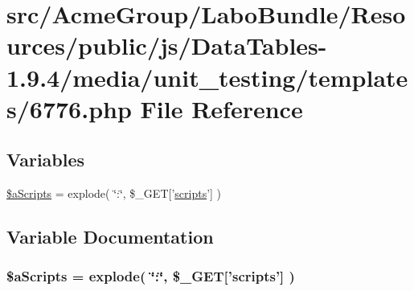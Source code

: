 \hypertarget{6776_8php}{\section{src/\+Acme\+Group/\+Labo\+Bundle/\+Resources/public/js/\+Data\+Tables-\/1.9.4/media/unit\+\_\+testing/templates/6776.php File Reference}
\label{6776_8php}
}
\subsection*{Variables}
\begin{DoxyCompactItemize}
\item 
\hyperlink{6776_8php_a3e8e1608000c9afdd05327fc2b06b056}{\$a\+Scripts} = explode( \char`\"{}\+:\char`\"{}, \$\+\_\+\+G\+E\+T\mbox{[}'\hyperlink{tinymce_8jquery_8dev_8js_a09066d4d580eeec222f858d588b4cdef}{scripts}'\mbox{]} )
\end{DoxyCompactItemize}


\subsection{Variable Documentation}
\hypertarget{6776_8php_a3e8e1608000c9afdd05327fc2b06b056}{
\subsubsection[{\$a\+Scripts}]{\setlength{\rightskip}{0pt plus 5cm}\$a\+Scripts = explode( \char`\"{}\+:\char`\"{}, \$\+\_\+\+G\+E\+T\mbox{[}'{\bf scripts}'\mbox{]} )}}\label{6776_8php_a3e8e1608000c9afdd05327fc2b06b056}
